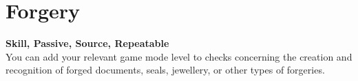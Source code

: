 \section{Forgery}\label{sec:forgery}
\textbf{Skill, Passive, Source, Repeatable}\\
You can add your relevant game mode level to checks concerning the creation and recognition of forged documents, seals, jewellery, or other types of forgeries.